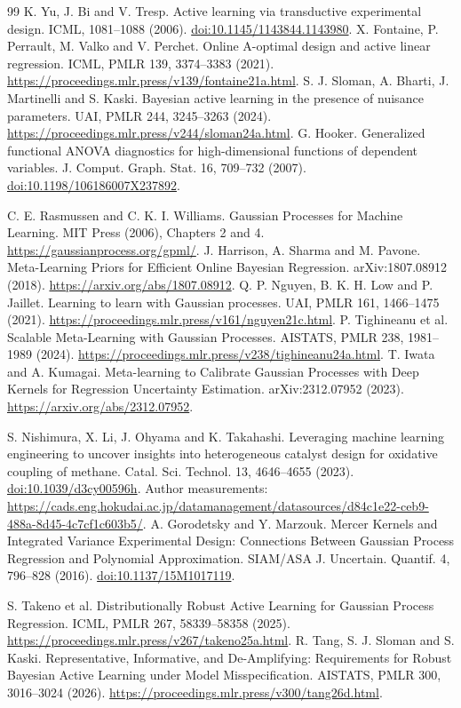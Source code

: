 \begin{thebibliography}{99}
 K. Yu, J. Bi and V. Tresp. Active learning via transductive experimental design. ICML, 1081--1088 (2006). \href{https://doi.org/10.1145/1143844.1143980}{doi:10.1145/1143844.1143980}.
 X. Fontaine, P. Perrault, M. Valko and V. Perchet. Online A-optimal design and active linear regression. ICML, PMLR 139, 3374--3383 (2021). \url{https://proceedings.mlr.press/v139/fontaine21a.html}.
 S. J. Sloman, A. Bharti, J. Martinelli and S. Kaski. Bayesian active learning in the presence of nuisance parameters. UAI, PMLR 244, 3245--3263 (2024). \url{https://proceedings.mlr.press/v244/sloman24a.html}.
 G. Hooker. Generalized functional ANOVA diagnostics for high-dimensional functions of dependent variables. J. Comput. Graph. Stat. 16, 709--732 (2007). \href{https://doi.org/10.1198/106186007X237892}{doi:10.1198/106186007X237892}.


 C. E. Rasmussen and C. K. I. Williams. Gaussian Processes for Machine Learning. MIT Press (2006), Chapters 2 and 4. \url{https://gaussianprocess.org/gpml/}.
 J. Harrison, A. Sharma and M. Pavone. Meta-Learning Priors for Efficient Online Bayesian Regression. arXiv:1807.08912 (2018). \url{https://arxiv.org/abs/1807.08912}.
 Q. P. Nguyen, B. K. H. Low and P. Jaillet. Learning to learn with Gaussian processes. UAI, PMLR 161, 1466--1475 (2021). \url{https://proceedings.mlr.press/v161/nguyen21c.html}.
 P. Tighineanu et al. Scalable Meta-Learning with Gaussian Processes. AISTATS, PMLR 238, 1981--1989 (2024). \url{https://proceedings.mlr.press/v238/tighineanu24a.html}.
 T. Iwata and A. Kumagai. Meta-learning to Calibrate Gaussian Processes with Deep Kernels for Regression Uncertainty Estimation. arXiv:2312.07952 (2023). \url{https://arxiv.org/abs/2312.07952}.


 S. Nishimura, X. Li, J. Ohyama and K. Takahashi. Leveraging machine learning engineering to uncover insights into heterogeneous catalyst design for oxidative coupling of methane. Catal. Sci. Technol. 13, 4646--4655 (2023). \href{https://doi.org/10.1039/d3cy00596h}{doi:10.1039/d3cy00596h}. Author measurements: \url{https://cads.eng.hokudai.ac.jp/datamanagement/datasources/d84c1e22-ceb9-488a-8d45-4c7cf1c603b5/}.
 A. Gorodetsky and Y. Marzouk. Mercer Kernels and Integrated Variance Experimental Design: Connections Between Gaussian Process Regression and Polynomial Approximation. SIAM/ASA J. Uncertain. Quantif. 4, 796--828 (2016). \href{https://doi.org/10.1137/15M1017119}{doi:10.1137/15M1017119}.


 S. Takeno et al. Distributionally Robust Active Learning for Gaussian Process Regression. ICML, PMLR 267, 58339--58358 (2025). \url{https://proceedings.mlr.press/v267/takeno25a.html}.
 R. Tang, S. J. Sloman and S. Kaski. Representative, Informative, and De-Amplifying: Requirements for Robust Bayesian Active Learning under Model Misspecification. AISTATS, PMLR 300, 3016--3024 (2026). \url{https://proceedings.mlr.press/v300/tang26d.html}.

\end{thebibliography}
